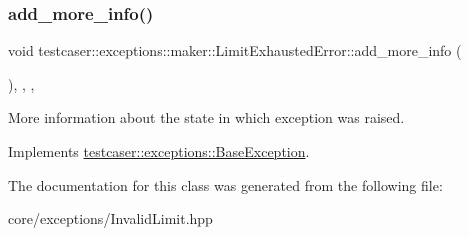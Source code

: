 \subsubsection{\texorpdfstring{add\_more\_info()}{add\_more\_info()}}
{\footnotesize\ttfamily void testcaser\+::exceptions\+::maker\+::\+Limit\+Exhausted\+Error\+::add\+\_\+more\+\_\+info (\begin{DoxyParamCaption}{ }\end{DoxyParamCaption})\hspace{0.3cm}{\ttfamily [inline]}, {\ttfamily [final]}, {\ttfamily [override]}, {\ttfamily [virtual]}}



More information about the state in which exception was raised. 



Implements \mbox{\hyperlink{classtestcaser_1_1exceptions_1_1BaseException_ad607ea04e2cb4ad9b8d0e2e6b6734f2f}{testcaser\+::exceptions\+::\+Base\+Exception}}.



The documentation for this class was generated from the following file\+:\begin{DoxyCompactItemize}
\item 
core/exceptions/Invalid\+Limit.\+hpp\end{DoxyCompactItemize}
